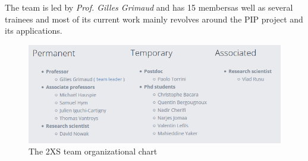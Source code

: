 The team is led by \textit{Prof. Gilles Grimaud} and has 15 members\footnotemark[1] as well as several trainees and most of its current work mainly revolves around the PIP project and its applications.

\begin{figure}[!ht]
	\centering 
	\includegraphics[width=\linewidth, frame]{img/2XS.png} 
	\caption[The 2XS team organizational chart]{The 2XS team organizational chart \cite{cristal}}
\end{figure}





